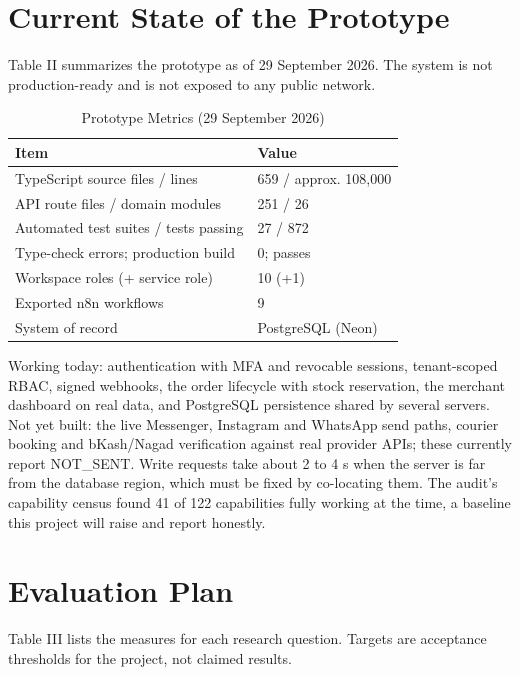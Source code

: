 \documentclass[conference,a4paper]{IEEEtran}
\begin{document}
\section{Current State of the Prototype}
Table II summarizes the prototype as of 29 September 2026. The system is not production-ready and is not exposed to any public network.

\begin{table}[!t]
\renewcommand{\arraystretch}{1.2}
\caption{Prototype Metrics (29 September 2026)}
\label{tab:2}
\centering\footnotesize
\begin{tabular}{|p{}|p{}|}
\hline
\textbf{Item} & \textbf{Value} \\
\hline
TypeScript source files / lines & 659 / approx. 108,000 \\
\hline
API route files / domain modules & 251 / 26 \\
\hline
Automated test suites / tests passing & 27 / 872 \\
\hline
Type-check errors; production build & 0; passes \\
\hline
Workspace roles (+ service role) & 10 (+1) \\
\hline
Exported n8n workflows & 9 \\
\hline
System of record & PostgreSQL (Neon) \\
\hline
\end{tabular}
\end{table}

Working today: authentication with MFA and revocable sessions, tenant-scoped RBAC, signed webhooks, the order lifecycle with stock reservation, the merchant dashboard on real data, and PostgreSQL persistence shared by several servers. Not yet built: the live Messenger, Instagram and WhatsApp send paths, courier booking and bKash/Nagad verification against real provider APIs; these currently report NOT\_SENT. Write requests take about 2 to 4 s when the server is far from the database region, which must be fixed by co-locating them. The audit's capability census found 41 of 122 capabilities fully working at the time, a baseline this project will raise and report honestly.


\section{Evaluation Plan}
Table III lists the measures for each research question. Targets are acceptance thresholds for the project, not claimed results.
\end{document}
